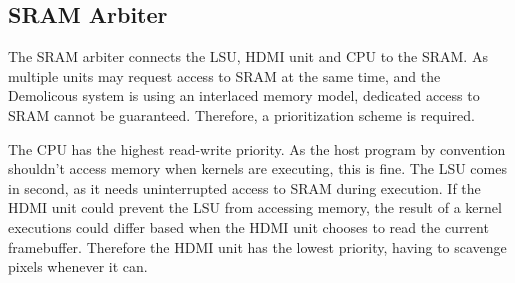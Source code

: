 \subsection{SRAM Arbiter}

The SRAM arbiter connects the LSU, HDMI unit and CPU to the SRAM.
As multiple units may request access to SRAM at the same time, and the Demolicous system is using an interlaced memory model,
dedicated access to SRAM cannot be guaranteed.
Therefore, a prioritization scheme is required.

The CPU has the highest read-write priority.
As the host program by convention shouldn't access memory when kernels are executing, this is fine.
The LSU comes in second, as it needs uninterrupted access to SRAM during execution.
If the HDMI unit could prevent the LSU from accessing memory,
the result of a kernel executions could differ based when the HDMI unit chooses to read the current framebuffer.
Therefore the HDMI unit has the lowest priority, having to scavenge pixels whenever it can.
